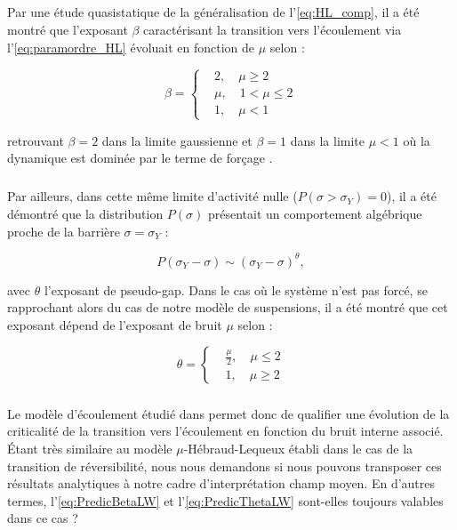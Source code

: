 \subparagraph{}Par une étude quasistatique de la généralisation de l'\autoref{eq:HL_comp}, il a été montré que l'exposant $\beta$ caractérisant la transition vers l'écoulement via l'\autoref{eq:paramordre_HL} évoluait en fonction de $\mu$ selon :

\begin{equation}
	\beta = \left\{
	\begin{aligned}
	&2, \quad \mu \geq 2\\
	&\mu, \quad 1<\mu\leq2\\
	&1, \quad \mu < 1
	\end{aligned}
	\right.
	\label{eq:PredicBetaLW}
\end{equation}

\noindent retrouvant $\beta = 2$ dans la limite gaussienne et $\beta = 1$ dans la limite $\mu<1$ où la dynamique est dominée par le terme de forçage \cite{lin_mean-field_2016}.

\subparagraph{}Par ailleurs, dans cette même limite d'activité nulle ($P(\sigma>\sigma_Y)=0$), il a été démontré que la distribution $P(\sigma)$ présentait un comportement algébrique proche de la barrière $\sigma = \sigma_Y$ \cite{lin_mean-field_2016} :

\begin{equation}
	P(\sigma_Y-\sigma) \sim (\sigma_Y-\sigma)^\theta,
\end{equation}

\noindent avec $\theta$ l'exposant de pseudo-gap. Dans le cas où le système n'est pas forcé, se rapprochant alors du cas de notre modèle de suspensions, il a été montré que cet exposant dépend de l'exposant de bruit $\mu$ selon :

\begin{equation}
	\theta = \left\{
	\begin{aligned}
	&\frac{\mu}{2}, \quad \mu \leq 2\\
	&1, \quad \mu \geq 2
	\end{aligned}
	\right.
	\label{eq:PredicThetaLW}
\end{equation}

\subparagraph{}Le modèle d'écoulement étudié dans \cite{lin_mean-field_2016, lin_microscopic_2018} permet donc de qualifier une évolution de la criticalité de la transition vers l'écoulement en fonction du bruit interne associé. \'Etant très similaire au modèle $\mu$-Hébraud-Lequeux établi dans le cas de la transition de réversibilité, nous nous demandons si nous pouvons transposer ces résultats analytiques à notre cadre d'interprétation champ moyen. En d'autres termes, l'\autoref{eq:PredicBetaLW} et l'\autoref{eq:PredicThetaLW} sont-elles toujours valables dans ce cas ?

